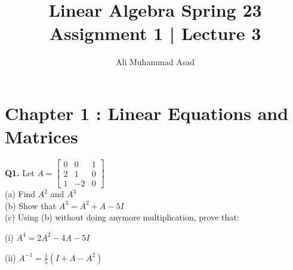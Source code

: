 \documentclass[addpoints]{exam}
\title{Linear Algebra Spring 23\\ Assignment 1 | Lecture 3}
\author{Ali Muhammad Asad}
\begin{document}
\maketitle
\begin{sloppypar}
\section*{\textbf{Chapter 1 : Linear Equations and Matrices}}
\begin{questions}
    \question
    \textbf{Q1. } Let $A = \begin{bmatrix}
        0 & 0 & 1 \\ 2 & 1 & 0 \\ 1 & -2 & 0
    \end{bmatrix} $ \\ 
    (a) Find $ A^2 $ and $ A^3 $ \\ 
    (b) Show that $ A^3 = A^2 + A - 5I $ \\ 
    (c) Using (b) without doing anymore multiplication, prove that: 

    \hspace{5mm} (i) $ A^4 = 2A^2 - 4A - 5I $

    \hspace{5mm} (ii) $ A^{-1} = \frac{1}{5}(I + A - A^2) $
    \begin{solution}
        

\end{solution}
\end{questions}
\end{sloppypar}
\end{document}
